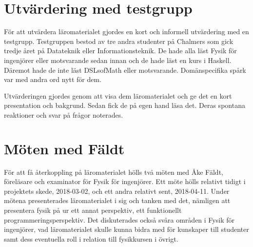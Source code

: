 \begin{draft}

\section{Utvärdering med testgrupp}


För att utvärdera läromaterialet gjordes en kort och informell utvärdering med en testgrupp. Testgruppen bestod av tre andra studenter på Chalmers som gick tredje året på Datateknik eller Informationsteknik. De hade alla läst Fysik för ingenjörer eller motsvarande sedan innan och de hade läst en kurs i Haskell. Däremot hade de inte läst DSLsofMath eller motsvarande. Domänspecifika spårk var med andra ord nytt för dem.

Utvärderingen gjordes genom att visa dem läromaterialet och ge det en kort presentation och bakgrund. Sedan fick de på egen hand läsa det. Deras spontana reaktioner och svar på frågor noterades.

\section{Möten med Fäldt}

För att få återkoppling på läromaterialet hölls två möten med Åke Fäldt, föreläsare och examinator för Fysik för ingenjörer. Ett möte hölls relativt tidigt i projektets skede, 2018-03-02, och ett andra relativt sent, 2018-04-11. Under mötena presenterades läromaterialet i sig och tanken med det, nämligen att presentera fysik på ur ett annat perspektiv, ett funktionellt programmeringsperspektiv. Det diskuterades också svåra områden i Fysik för ingenjörer, vad läromaterialet skulle kunna bidra med för kunskaper till studenter samt dess eventuella roll i relation till fysikkursen i övrigt.

\end{draft}
























